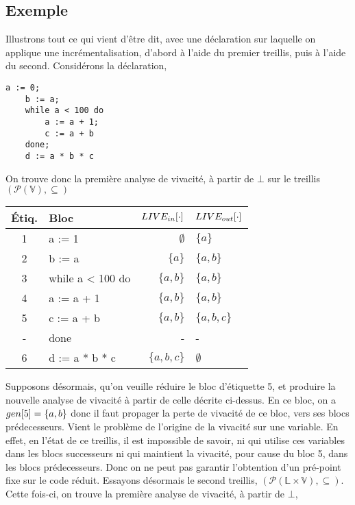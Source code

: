 \documentclass[a4paper, 11pt]{article}
\begin{document}
\subsection{Exemple}
Illustrons tout ce qui vient d'être dit, avec une déclaration sur laquelle on applique une incrémentalisation, d'abord à l'aide du premier
treillis, puis à l'aide du second. Considérons la déclaration,
\begin{lstlisting}[tabsize=2]
	a := 0;
	b := a;
	while a < 100 do
		a := a + 1;
		c := a + b
	done;
	d := a * b * c
\end{lstlisting}
On trouve donc la première analyse de vivacité, à partir de $\bot$ sur le treillis $(\mathcal{P}(\mathbb{V}), \subseteq)$
\begin{center}
	\begin{tabular}{||c|l|r|l||}
	\hline
	Étiq. & Bloc & $LIVE_{in}[\cdot]$ & $LIVE_{out}[\cdot]$ \\
	\hline
	1 & a := 1 & $\emptyset$ & $\{a\}$\\
	2 & b := a & $\{a\}$ & $\{a, b\}$\\
	3 & while a < 100 do & $\{a, b\}$ & $\{a, b\}$\\
	4 & a := a + 1 & $\{a, b\}$ & $\{a, b\}$\\
	5 & c := a + b & $\{a, b\}$ & $\{a, b, c\}$\\
	- & done & - & -\\
	6 & d := a * b * c & $\{a, b, c\}$ & $\emptyset$\\
	\hline
	\end{tabular}
\end{center}
Supposons désormais, qu'on veuille réduire le bloc d'étiquette 5, et produire la nouvelle analyse de vivacité
à partir de celle décrite ci-dessus. En ce bloc, on a $gen[5] = \{a, b\}$ donc il faut propager la perte de vivacité
de ce bloc, vers ses blocs prédecesseurs. Vient le problème de l'origine de la vivacité sur une variable. En effet,
en l'état de ce treillis, il est impossible de savoir, ni qui utilise ces variables dans les blocs successeurs ni qui
maintient la vivacité, pour cause du bloc 5, dans les blocs prédecesseurs. Donc on ne peut pas garantir l'obtention d'un
pré-point fixe sur le code réduit. Essayons désormais le second treillis, 
$(\mathcal{P}(\mathbb{L} \times \mathbb{V}), \subseteq)$. Cette fois-ci, on trouve la première analyse de vivacité, à partir
de $\bot$,
\end{document}
